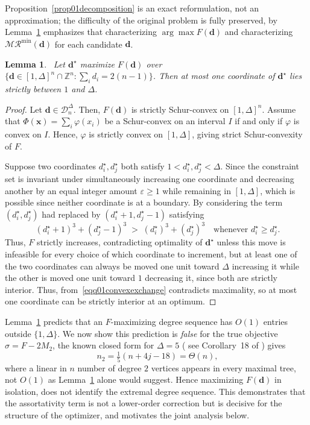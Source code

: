 \documentclass[12pt]{amsart}
\newtheorem{lemma}[theorem]{Lemma}
\newcommand{\RR}{\mathcal{MR}}
\begin{document}
Proposition~\ref{prop01decomposition} is an exact reformulation, not an approximation; the difficulty of the original problem is fully preserved, by Lemma~\ref{lem001oneinterior} emphasizes that characterizing $\arg\max F(\mathbf d)$ and characterizing $\RR^{\min}(\mathbf d)$ for each candidate $\mathbf d$. 



\begin{lemma}~\label{lem001oneinterior}
Let $\mathbf d^\star$ maximize $F(\mathbf d)$ over
$\{\mathbf d\in[1,\Delta]^n \cap \mathbb Z^n : \sum_i d_i = 2(n-1)\}$. Then at most one coordinate of $\mathbf d^\star$
lies strictly between $1$ and $\Delta$.
\end{lemma}
\begin{proof}
Let $\mathbf d\in\mathcal D_n^\Delta$. Then, $F(\mathbf d)$ is strictly Schur-convex on $[1,\Delta]^n$. Assume that $\Phi(\mathbf x)=\sum_i \varphi(x_i)$ be a Schur-convex on an interval $I$ if and
only if $\varphi$ is convex on $I$. Hence, $\varphi$ is strictly convex on $[1,\Delta]$, giving strict Schur-convexity of $F$. 

Suppose two coordinates $d_i^\star,d_j^\star$ both satisfy
$1<d_i^\star,d_j^\star<\Delta$. Since the constraint set is invariant under
simultaneously increasing one coordinate and decreasing another by an equal
integer amount $\varepsilon\ge 1$ while remaining in $[1,\Delta]$, which is
possible since neither coordinate is at a boundary. By considering the term $(d_i^\star,d_j^\star)$  had replaced by $(d_i^\star+1,d_j^\star-1)$ satisfying
\begin{equation}~\label{eqq01convexexchange}
(d_i^\star+1)^3+(d_j^\star-1)^3 \;>\; (d_i^\star)^3+(d_j^\star)^3
\quad\text{whenever } d_i^\star \ge d_j^\star.
\end{equation}
Thus,  $F$ strictly increases, contradicting
optimality of $\mathbf d^\star$ unless this move is infeasible for every choice
of which coordinate to increment, but at least one of the two coordinates can
always be moved one unit toward $\Delta$ increasing it while the other is
moved one unit toward $1$ decreasing it, since both are strictly interior. Thus, from~\eqref{eqq01convexexchange} contradicts maximality, so at most one coordinate can be strictly interior at an optimum.
\end{proof}


Lemma~\ref{lem001oneinterior} predicts that an $F$-maximizing degree sequence
has $O(1)$ entries outside $\{1,\Delta\}$. We now show
this prediction is \emph{false} for the true objective $\sigma=F-2M_2$, the
known closed form for $\Delta=5$ ( see Corollary~18 of \cite{DimitrovPaper2025}) gives
\begin{equation}~\label{eqq2n2linear}
n_2 = \tfrac{1}{5}(n+4j-18) = \Theta(n),
\end{equation}
where a  linear in $n$ number of degree $2$ vertices appears in every
maximal tree, not $O(1)$ as Lemma~\ref{lem001oneinterior} alone would suggest.
Hence maximizing $F(\mathbf d)$ in isolation,  does not identify the extremal degree sequence.
This demonstrates that the assortativity term is not a lower-order correction
but is decisive for the structure of the optimizer, and motivates the joint
analysis below.
\end{document}
